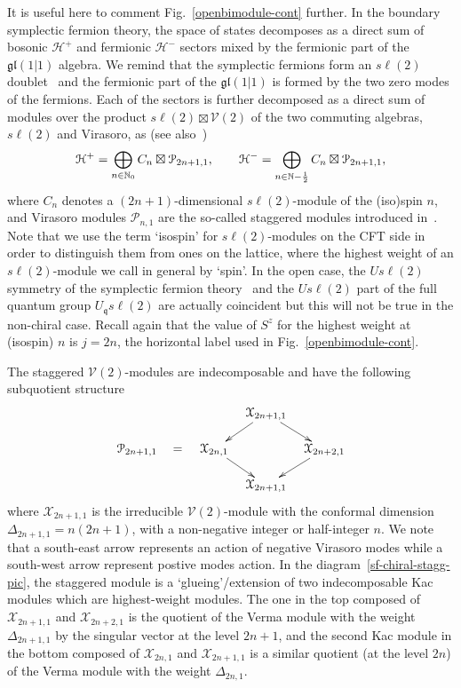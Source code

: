 \documentclass[11pt]{article}
\newcommand{\q}{\mathfrak{q}}
\newcommand{\ffrac}[2]{\mbox{\footnotesize$\displaystyle\frac{#1}{#2}$}}
\newcommand{\LQG}{U_{\q} s\ell(2)}
\newcommand{\half}{%
  \mathchoice{\ffrac{1}{2}}{\frac{1}{2}}{\frac{1}{2}}{\frac{1}{2}}}
\newcommand{\oN}{\mathbb{N}}
\newcommand{\Vir}{\mathcal{V}}
\newcommand{\SU}{s\ell}
\newcommand{\SUrep}[1]{C_{#1}}
\newcommand{\gl}{\mathfrak{gl}}
\newcommand{\WP}{\mathcal{H}}
\newcommand{\VX}{\mathcal{X}}
\newcommand{\VP}{\mathcal{P}}
\theoremstyle{definition}
\begin{document}
It is useful here to comment Fig.~\ref{openbimodule-cont} further.  In the boundary symplectic fermion theory,
 the space of states decomposes as a direct sum of bosonic $\WP^+$ and
 fermionic $\WP^-$ sectors mixed by the fermionic part of the
 $\gl(1|1)$ algebra. We remind that the  symplectic fermions form an
 $s\ell(2)$ doublet~\cite{Kausch} and the fermionic part of the
 $\gl(1|1)$ is formed by the two zero modes of the fermions.
 Each of the sectors is further decomposed  as a direct sum
 of modules over the product $\SU(2)\boxtimes\Vir(2)$ of
 the two  commuting algebras, $\SU(2)$ and Virasoro, as (see also~\cite{[FFHST]})
 \begin{equation}\label{W-proj-ch-decomp}
\WP^{+} = \bigoplus_{n\in\oN_0} \SUrep{n}\boxtimes\VP_{2n+1,1},\qquad
\WP^{-} = \bigoplus_{n\in\oN-\half} \SUrep{n}\boxtimes\VP_{2n+1,1},
\end{equation}
where $\SUrep{n}$ denotes a $(2n+1)$-dimensional $\SU(2)$-module of
 the (iso)spin $n$, and Virasoro modules $\VP_{n,1}$ are the so-called
 staggered modules introduced in~\cite{Rohsiepe}. Note that we use the
 term `isospin' for $\SU(2)$-modules on the CFT side in order to
 distinguish them from ones on the lattice, where the highest weight
 of an $\SU(2)$-module we call in general by `spin'. In the open case,
 the $U \SU(2)$ symmetry of the symplectic fermion theory~\cite{Kausch}
 and the $U \SU(2)$ part of the full quantum group $\LQG$ are
 actually coincident but this will not be true in the non-chiral
 case. Recall again that the value of $S^z$ for the highest weight at
 (isospin) $n$ is $j=2n$, the horizontal label used in
 Fig.~\ref{openbimodule-cont}.

The staggered
 $\Vir(2)$-modules  are indecomposable and have the following subquotient structure
\begin{equation}\label{sf-chiral-stagg-pic}
   \xymatrix@C=10pt@R=15pt@M=2pt@W=2pt{%
    &&{\VX_{2n+1,1}}\ar[dl]\ar[dr]&\\
    \VP_{2n+1,1} \quad = &\VX_{2n,1}\ar[dr]&&\VX_{2n+2,1}\ar[dl]\\
    &&{\VX_{2n+1,1}}&
 }
\end{equation}
where $\VX_{2n+1,1}$ is the irreducible $\Vir(2)$-module with the
conformal dimension $\Delta_{2n+1,1}=n(2n+1)$, with a non-negative
integer or half-integer $n$. We note that a
south-east arrow represents an action of negative Virasoro modes while
a south-west arrow represent postive modes action. In the
diagram~\eqref{sf-chiral-stagg-pic}, the staggered module is a
`glueing'/extension of two indecomposable Kac modules which are
highest-weight modules. The one in the top composed of
$\VX_{2n+1,1}$ and $\VX_{2n+2,1}$ is the quotient of the Verma module
with the weight $\Delta_{2n+1,1}$ by the singular vector at the level $2n+1$,
and the second Kac module in the bottom composed of
$\VX_{2n,1}$ and $\VX_{2n+1,1}$ is a similar quotient (at the level $2n$) of the Verma module with
the weight $\Delta_{2n,1}$.
\end{document}
